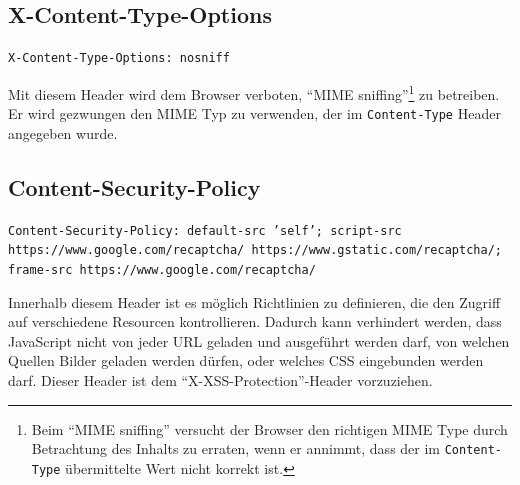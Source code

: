 \documentclass[12pt,DIV14,BCOR10mm,a4paper,parskip=half-,headsepline,headinclude,english,ngerman,bibliography=totocnumbered]{scrreprt}
\begin{document}
\subsection{X-Content-Type-Options}
\begin{sloppypar}
\texttt{X-Content-Type-Options: nosniff}
\end{sloppypar}
Mit diesem Header wird dem Browser verboten, \enquote{MIME sniffing}\footnote{Beim \enquote{MIME sniffing} versucht der Browser den richtigen MIME Type durch Betrachtung des Inhalts zu erraten, wenn er annimmt, dass der im \texttt{Content-Type} übermittelte Wert nicht korrekt ist.} zu betreiben. Er wird gezwungen den MIME Typ zu verwenden, der im \texttt{Content-Type} Header angegeben wurde.

\subsection{Content-Security-Policy}
\begin{sloppypar}
\texttt{Content-Security-Policy: default-src 'self'; script-src https://www.google.com/recaptcha/ https://www.gstatic.com/recaptcha/; frame-src https://www.google.com/recaptcha/}
\end{sloppypar}
Innerhalb diesem Header ist es möglich Richtlinien zu definieren, die den Zugriff auf verschiedene Resourcen kontrollieren.
Dadurch kann verhindert werden, dass JavaScript nicht von jeder URL geladen und ausgeführt werden darf, von welchen Quellen Bilder geladen werden dürfen, oder welches CSS eingebunden werden darf.
Dieser Header ist dem \enquote{X-XSS-Protection}-Header vorzuziehen.


\printbibliography

\printacronyms[title=Abkürzungsverzeichnis,toctitle=Abkürzungsverzeichnis]
\printglossary[title=Glossar,toctitle=Glossar,type=main]

\iftotalfigures
  \listoffigures
\fi

\end{document}
